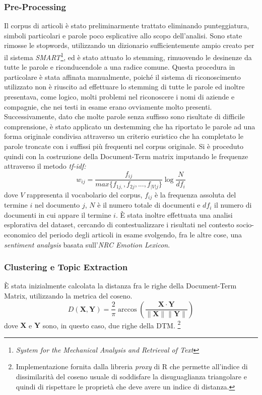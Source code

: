 \documentclass[]{article}
\begin{document}
\subsubsection{Pre-Processing}
Il corpus di articoli è stato preliminarmente trattato eliminando punteggiatura, simboli particolari e parole poco esplicative allo scopo dell'analisi. \newline 
Sono state rimosse le stopwords, utilizzando un dizionario sufficientemente ampio creato per il sistema \textit{SMART}\footnote{\textit{System for the Mechanical Analysis and Retrieval of Text}}, ed è stato attuato lo stemming, rimuovendo le desinenze da tutte le parole e riconducendole a una radice comune. Questa procedura in particolare è stata affinata manualmente, poiché il sistema di riconoscimento utilizzato non è riuscito ad effettuare lo stemming di tutte le parole ed inoltre presentava, come logico, molti problemi nel riconoscere i nomi di aziende e compagnie, che nei testi in esame erano ovviamente molto presenti. \newline
Successivamente, dato che molte parole senza suffisso sono risultate di difficile comprensione, è stato applicato un destemming che ha riportato le parole ad una forma originale condivisa attraverso un criterio euristico che ha completato le parole troncate con i suffissi più frequenti nel corpus originale. \newline
Si è proceduto quindi con la costruzione della Document-Term matrix imputando le frequenze attraverso il metodo \textit{tf-idf:}\[ w_{ij}=\frac{f_{ij}}{max\{{f_{1j,},f_{2j},...,f_{|V|j}}\}} \log{\frac{N}{df_{i}}}\]
dove $V$ rappresenta il vocabolario del corpus, $f_{ij}$ è la frequenza assoluta del termine $i$ nel documento $j$, $N$ è il numero totale di documenti e $df_{i}$ il numero di documenti in cui appare il termine $i$.
\newline
È stata inoltre effettuata una analisi esplorativa del dataset, cercando di contestualizzare i risultati nel contesto socio-economico del periodo degli articoli in esame svolgendo, fra le altre cose, una \textit{sentiment analysis} basata sull'\textit{NRC Emotion Lexicon}.\cite{NRC}
\subsubsection{Clustering e Topic Extraction}
È stata inizialmente calcolata la distanza fra le righe della Document-Term Matrix, utilizzando la metrica del coseno.
\[D(\mathbf{X}, \mathbf{Y}) = \frac{2}{\pi}\arccos(\frac{\mathbf{X}\cdot\mathbf{Y}}{\|\mathbf{X}\|\|\mathbf{Y}\|})\]
dove $\mathbf{X}$ e $\mathbf{Y}$ sono, in questo caso, due righe della DTM. \footnote{Implementazione fornita dalla libreria \textit{proxy} di R che permette all'indice di dissimilarità del coseno usuale di soddisfare la disuguaglianza triangolare e quindi di rispettare le proprietà che deve avere un indice di distanza.} \cite{proxy}
\end{document}
